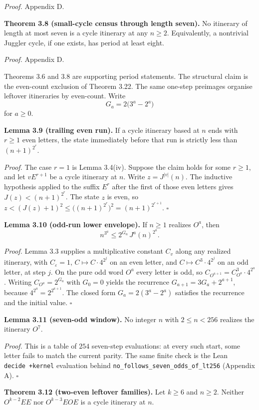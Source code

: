 \documentclass[12pt]{article}
\begin{document}
\emph{Proof.} Appendix D.

\textbf{Theorem 3.8 (small-cycle census through length seven).} No
itinerary of length at most seven is a cycle itinerary at any
\(n\ge 2\). Equivalently, a nontrivial Juggler cycle, if one exists, has
period at least eight.

\emph{Proof.} Appendix D.

Theorems 3.6 and 3.8 are supporting period statements. The structural
claim is the even-count exclusion of Theorem 3.22. The same one-step
preimages organise leftover itineraries by even-count. Write \[
G_a=2\bigl(3^a-2^a\bigr)
\] for \(a\ge 0\).

\textbf{Lemma 3.9 (trailing even run).} If a cycle itinerary based at
\(n\) ends with \(r\ge 1\) even letters, the state immediately before
that run is strictly less than \((n+1)^{2^r}\).

\emph{Proof.} The case \(r=1\) is Lemma 3.4(iv). Suppose the claim holds
for some \(r\ge 1\), and let \(vE^{r+1}\) be a cycle itinerary at \(n\).
Write \(z=J^{|v|}(n)\). The inductive hypothesis applied to the suffix
\(E^r\) after the first of those even letters gives
\(J(z)<(n+1)^{2^r}\). The state \(z\) is even, so
\(z<(J(z)+1)^2\le\bigl((n+1)^{2^r}\bigr)^2=(n+1)^{2^{r+1}}\).
\(\square\)

\textbf{Lemma 3.10 (odd-run lower envelope).} If \(n\ge 1\) realizes
\(O^a\), then \[
n^{3^a}\le 2^{G_a}\,J^a(n)^{2^a}.
\]

\emph{Proof.} Lemma 3.3 supplies a multiplicative constant \(C_v\) along
any realized itinerary, with \(C_\varepsilon=1\),
\(C\mapsto C\cdot 4^{2^j}\) on an even letter, and
\(C\mapsto C^3\cdot 4^{2^j}\) on an odd letter, at step \(j\). On the
pure odd word \(O^a\) every letter is odd, so
\(C_{O^{a+1}}=C_{O^a}^3\cdot 4^{2^a}\). Writing \(C_{O^a}=2^{G_a}\) with
\(G_0=0\) yields the recurrence \(G_{a+1}=3G_a+2^{a+1}\), because
\(4^{2^a}=2^{2^{a+1}}\). The closed form \(G_a=2(3^a-2^a)\) satisfies
the recurrence and the initial value. \(\square\)

\textbf{Lemma 3.11 (seven-odd window).} No integer \(n\) with
\(2\le n<256\) realizes the itinerary \(O^7\).

\emph{Proof.} This is a table of \(254\) seven-step evaluations: at
every such start, some letter fails to match the current parity. The
same finite check is the Lean \texttt{decide\ +kernel} evaluation behind
\texttt{\nolinkurl{no_follows_seven_odds_of_lt256}} (Appendix A).
\(\square\)

\textbf{Theorem 3.12 (two-even leftover families).} Let \(k\ge 6\) and
\(n\ge 2\). Neither \(O^{k-2}EE\) nor \(O^{k-3}EOE\) is a cycle
itinerary at \(n\).
\end{document}

